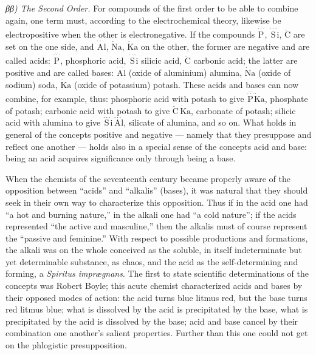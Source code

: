 \documentclass[12pt,a4paper]{book}
\begin{document}
\emph{ββ) The Second Order.} For compounds of the first order to be able to
combine again, one term must, according to the electrochemical theory, likewise
be electropositive when
the other is electronegative. If the compounds
$\stackrel{\stackrel{\cdot\cdot}{\cdot\cdot\cdot}}{\mathrm{P}}$,
$\stackrel{\cdot\cdot\cdot}{\mathrm{S}}\mathrm{i}$,
$\ddot{\mathrm{C}}$
are set on the one side, and
$\stackrel{\cdot\cdot\cdot}{\mathrm{A}}\mathrm{l}$,
$\dot{\mathrm{N}}\mathrm{a}$, $\dot{\mathrm{K}}\mathrm{a}$
on the other, the former are
negative and are called acids:
$\stackrel{\stackrel{\cdot\cdot}{\cdot\cdot\cdot}}{\mathrm{P}}$,
phosphoric acid, $\stackrel{\cdot\cdot\cdot}{\mathrm{S}}\mathrm{i}$
silicic acid, $\ddot{\mathrm{C}}$ carbonic acid; the latter are positive and
are called bases: $\stackrel{\cdot\cdot\cdot}{\mathrm{A}}\mathrm{l}$
(oxide of aluminium) alumina, $\dot{\mathrm{N}}\mathrm{a}$ (oxide of sodium)
soda, $\dot{\mathrm{K}}\mathrm{a}$ (oxide of potassium) potash.
These acids and bases can now combine, for example, thus:
phosphoric acid with potash to give
$\stackrel{\stackrel{\cdot\cdot}{\cdot\cdot\cdot}}{\mathrm{P}}\dot{\mathrm{K}}\mathrm{a}$,
phosphate of potash; carbonic acid with potash to give
$\ddot{\mathrm{C}}\,\dot{\mathrm{K}}\mathrm{a}$, carbonate of potash;
silicic acid with alumina to give
$\stackrel{\cdot\cdot\cdot}{\mathrm{S}}\mathrm{i}\,\stackrel{\cdot\cdot\cdot}{\mathrm{A}}\mathrm{l}$,
silicate of alumina, and so on. What holds in general of the concepts positive
and negative --- namely that they presuppose and reflect one another --- holds
also in a special sense of the concepts acid and base: being an acid acquires
significance only through being a base.

When the chemists of the seventeenth century became properly aware of the
opposition between ``acids'' and ``alkalis'' (bases), it was natural that they
should seek in their own way to characterize this opposition. Thus if in the
acid one had ``a hot and burning nature,'' in the alkali one had ``a cold
nature''; if the acids represented ``the active and masculine,'' then the
alkalis must of course represent the ``passive and feminine.'' With respect to
possible productions and formations, the alkali was on the whole conceived as
the soluble, in itself indeterminate but yet determinable substance, as chaos,
and the acid as the self-determining and forming, a \textit{Spiritus
imprægnans}. The first to state scientific determinations of the concepts was
Robert Boyle; this acute chemist characterized acids and bases by their opposed
modes of action: the acid turns blue litmus red, but the base turns red litmus
blue; what is dissolved by the acid is precipitated by the base, what is
precipitated by the acid is dissolved by the base; acid and base cancel by
their combination one another's salient properties. Further than this one could
not get on the phlogistic presupposition.
\setcounter{footnote}{0}
\end{document}
